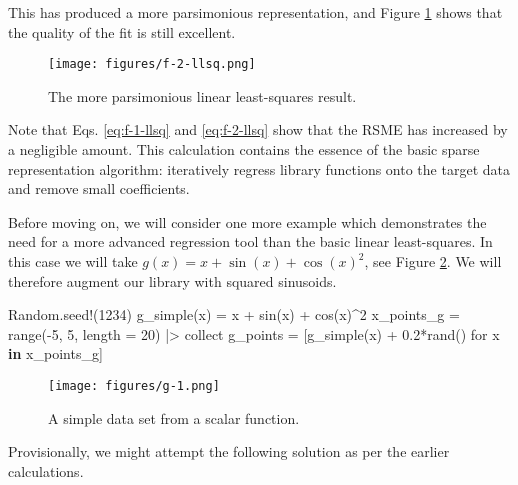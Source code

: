 \documentclass[
]{article}
\newenvironment{Shaded}{\begin{snugshade}}{\end{snugshade}}
\newcommand{\BuiltInTok}[1]{\textcolor[rgb]{0.00,0.23,0.31}{#1}}
\newcommand{\FloatTok}[1]{\textcolor[rgb]{0.68,0.00,0.00}{#1}}
\newcommand{\FunctionTok}[1]{\textcolor[rgb]{0.28,0.35,0.67}{#1}}
\newcommand{\KeywordTok}[1]{\textcolor[rgb]{0.00,0.23,0.31}{\textbf{#1}}}
\newcommand{\NormalTok}[1]{\textcolor[rgb]{0.00,0.23,0.31}{#1}}
\newcommand{\OperatorTok}[1]{\textcolor[rgb]{0.37,0.37,0.37}{#1}}
\begin{document}
This has produced a more parsimonious representation, and Figure
\ref{fig:f-2-llsq} shows that the quality of the fit is still excellent.

\begin{figure}
    \centering
    \texttt{[image: figures/f-2-llsq.png]}
    \caption{The more parsimonious linear least-squares result.}
    \label{fig:f-2-llsq}
\end{figure}

Note that Eqs. \eqref{eq:f-1-llsq} and \eqref{eq:f-2-llsq} show that the
RSME has increased by a negligible amount. This calculation contains the
essence of the basic sparse representation algorithm: iteratively
regress library functions onto the target data and remove small
coefficients.

Before moving on, we will consider one more example which demonstrates
the need for a more advanced regression tool than the basic linear
least-squares. In this case we will take
\(g(x) = x + \sin(x) + \cos(x)^2\), see Figure \ref{fig:g-1}. We will
therefore augment our library with squared sinusoids.

\begin{Shaded}
\begin{Highlighting}[]
\BuiltInTok{Random}\NormalTok{.}\FunctionTok{seed!}\NormalTok{(}\FloatTok{1234}\NormalTok{)}
\FunctionTok{g\_simple}\NormalTok{(x) }\OperatorTok{=}\NormalTok{ x }\OperatorTok{+} \FunctionTok{sin}\NormalTok{(x) }\OperatorTok{+} \FunctionTok{cos}\NormalTok{(x)}\OperatorTok{\^{}}\FloatTok{2}
\NormalTok{x\_points\_g }\OperatorTok{=} \FunctionTok{range}\NormalTok{(}\OperatorTok{{-}}\FloatTok{5}\NormalTok{, }\FloatTok{5}\NormalTok{, length }\OperatorTok{=} \FloatTok{20}\NormalTok{) }\OperatorTok{|\textgreater{}}\NormalTok{ collect}
\NormalTok{g\_points }\OperatorTok{=}\NormalTok{ [}\FunctionTok{g\_simple}\NormalTok{(x) }\OperatorTok{+} \FloatTok{0.2}\FunctionTok{*rand}\NormalTok{() for x }\KeywordTok{in}\NormalTok{ x\_points\_g]}
\end{Highlighting}
\end{Shaded}

\begin{figure}
    \centering
    \texttt{[image: figures/g-1.png]}
    \caption{A simple data set from a scalar function.}
    \label{fig:g-1}
\end{figure}

Provisionally, we might attempt the following solution as per the
earlier calculations.
\end{document}
